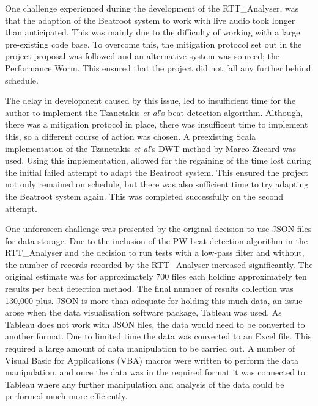 \documentclass[a4paper, 11pt]{article}
\begin{document}
One challenge experienced during the development of the RTT\_Analyser, was that the adaption of the Beatroot system to work with live audio took longer than anticipated. This was mainly due to the difficulty of working with a large pre-existing code base. To overcome this, the mitigation protocol set out in the project proposal was followed and an alternative system was sourced; the Performance Worm. This ensured that the project did not fall any further behind schedule.\par 

The delay in development caused by this issue, led to insufficient time for the author to implement the Tzanetakis \textit{et al}'s \cite{tzane1} beat detection algorithm. Although, there was a mitigation protocol in place, there was insufficent time to implement this, so a different course of action was chosen. A preexisting Scala implementation of the Tzanetakis \textit{et al}'s \cite{tzane1} DWT method by Marco Ziccard\cite{marcoZin} was used. Using this implementation, allowed for the regaining of the time lost during the initial failed attempt to adapt the Beatroot system. This ensured the project not only remained on schedule, but there was also sufficient time to try adapting the Beatroot system again. This was completed successfully on the second attempt.\par

One unforeseen challenge was presented by the original decision to use JSON files for data storage. Due to the inclusion of the PW beat detection algorithm in the RTT\_Analyser and the decision to run tests with a low-pass filter and without, the number of records recorded by the RTT\_Analyser increased significantly. The original estimate was for approximately 700 files each holding approximately ten results per beat detection method. The final number of results collection was 130,000 plus. JSON is more than adequate for holding this much data, an issue arose when the data visualisation software package, Tableau\cite{tableau} was used. As Tableau does not work with JSON files, the data would need to be converted to another format. Due to limited time the data was converted to an Excel\cite{excel} file. This required a large amount of data manipulation to be carried out. A number of Visual Basic for Applications (VBA) macros were written to perform the data manipulation, and once the data was in the required format it was connected to Tableau where any further manipulation and analysis of the data could be performed much more efficiently. 
\end{document}
